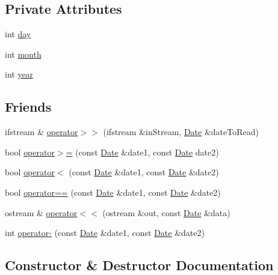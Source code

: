 \subsection*{Private Attributes}
\begin{DoxyCompactItemize}
\item 
int \hyperlink{class_date_a5b192adcabf2b2871e3f0b76c1ec1601}{day}
\item 
int \hyperlink{class_date_a533843e07c6ac8d19fee9b16f5336ba2}{month}
\item 
int \hyperlink{class_date_a3eeced2ed56bc95d56782b9e738db8ea}{year}
\end{DoxyCompactItemize}
\subsection*{Friends}
\begin{DoxyCompactItemize}
\item 
ifstream \& \hyperlink{class_date_ab895bef0d8545ab4875f6bfc4a7fd4f7}{operator$>$$>$} (ifstream \&in\+Stream, \hyperlink{class_date}{Date} \&date\+To\+Read)
\item 
bool \hyperlink{class_date_ad9736995fa90a35631dc5f220e33e4b2}{operator$>$=} (const \hyperlink{class_date}{Date} \&date1, const \hyperlink{class_date}{Date} date2)
\item 
bool \hyperlink{class_date_aa2e695ccf211714fafbc8c73cb7e5419}{operator$<$} (const \hyperlink{class_date}{Date} \&date1, const \hyperlink{class_date}{Date} \&date2)
\item 
bool \hyperlink{class_date_a588c6068972f9e69bc50292405c1fac7}{operator==} (const \hyperlink{class_date}{Date} \&date1, const \hyperlink{class_date}{Date} \&date2)
\item 
ostream \& \hyperlink{class_date_a7f6a6b50c5a5aca26dd5b5631c2f5c43}{operator$<$$<$} (ostream \&out, const \hyperlink{class_date}{Date} \&data)
\item 
int \hyperlink{class_date_ac5bf05534baacb5dc11f6abbb4e1f621}{operator-\/} (const \hyperlink{class_date}{Date} \&date1, const \hyperlink{class_date}{Date} \&date2)
\end{DoxyCompactItemize}


\subsection{Constructor \& Destructor Documentation}
\hypertarget{class_date_a4e59ed4ba66eec61c27460c5d09fa1bd}{}\label{class_date_a4e59ed4ba66eec61c27460c5d09fa1bd} 
